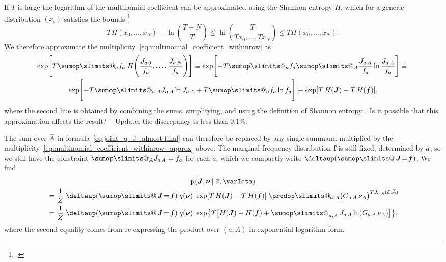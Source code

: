 \documentclass[\ifafour a4paper,12pt,\else a5paper,10pt,\fi%
onecolumn,oneside,article,%
british%
]{memoir}
\makeatletter
\theoremstyle{remark}
\theoremstyle{innote}
\def\sum{\DOTSI\sumop\slimits@}
\def\prod{\DOTSI\prodop\slimits@}
\newcommand*{\citep}{\footcites}
\newcommand*{\delt}{\deltaup}%
\newcommand*{\di}{\mathrm{d}}%
\renewcommand*{\le}{\leqslant}%
\newcommand*{\pf}{\mathrm{p}}%
\renewcommand*{\|}[1][]{\nonscript\,#1\vert\nonscript\;\mathopen{}}
\newcommand*{\tsum}{\mathop{\textstyle\sum}\nolimits}
\newcommand*{\puzzle}{{\fontencoding{U}\fontfamily{fontawesometwo}\selectfont\symbol{225}}}
\newcommand{\mynote}[1]{ {\color{notecolour}\puzzle\ #1}}
\newcommand*{\widebar}[1]{{\mkern1.5mu\skew{2}\overline{\mkern-1.5mu#1\mkern-1.5mu}\mkern 1.5mu}}
\newcommand*{\yff}{f}
\newcommand*{\yf}{\bm{\yff}}
\newcommand*{\yAs}{\widebar{A}}%
\newcommand*{\yas}{\widebar{a}}%
\newcommand*{\ynuu}{\nu}
\newcommand*{\ynu}{\bm{\ynuu}}
\newcommand*{\ysh}{H}
\newcommand*{\yeq}{\mathrel{\!=\!}}
\newcommand*{\yJJ}{J}
\newcommand*{\yJ}{\bm{\yJJ}}
\newcommand*{\yI}{\varIota}
\makeatother
\begin{document}
If $T$ is large the logarithm of the multinomial coefficient can be
approximated using the Shannon entropy $\ysh$, which for a generic
distribution $(x_{i})$ satisfies the bounds \citep[Lemma 2.2 pp.
429--430 in][]{csiszaretal2004b}
\begin{equation}
  \label{eq:approx_multinomial}
  T \ysh(x_{0},\dotsc,x_{N}) - \ln\binom{T+N}{T} \le
  \ln\binom{T}{Tx_{0},\dotsc,Tx_{N}} \le T \ysh(x_{0},\dotsc,x_{N}).
\end{equation}
We therefore approximate the
multiplicity~\eqref{eq:multinomial_coefficient_withinrow} as
\begin{multline}
  \label{eq:multinomial_coefficient_withinrow_approx}
  \exp\Biggl[T\sum_{a} f_{a}\;\ysh\Biggl(
\frac{J_{a\,0}}{f_{a}}, \dotsc,
\frac{J_{a\,N}}{f_{a}}\Biggr)
    \Biggr] \equiv
  \exp\Biggl[-T\sum_{a} f_{a} \sum_{A}
    \frac{J_{a\,A}}{f_{a}}\ln\frac{J_{a\,A}}{f_{a}}
    \Biggr]
    \equiv{}\\
    \exp\Biggl[-T \sum_{a,A} J_{a\,A}\ln J_{a\,A} + T  \sum_{a} f_{a}\ln f_{a}\Biggr]
    \equiv
    \exp[T\,\ysh(\yJ) - T\,\ysh(\yf)],
\end{multline}
where the second line is obtained by combining the sums, simplifying, and
using the definition of Shannon entropy. \mynote{Is it possible that this
  approximation affects the result? -- Update: the discrepancy is less than
0.1\%.}

\bigskip

The sum over $\yAs$ in formula~\eqref{eq:joint_q_J_almost-final} can
therefore be replaced by any single summand multiplied by the
multiplicity~\eqref{eq:multinomial_coefficient_withinrow_approx} above. The
marginal frequency distribution $\yf$ is still fixed, determined by $\yas$,
so we still have the constraint $\sum_{A}J_{a\,A}=f_{a}$ for each $a$,
which we compactly write $\delt(\tsum\yJ\yeq \yf)$. We find
\begin{multline}
  \label{eq:final_expression_multiplicity}
      \pf(\yJ, \ynu \| \yas, \yI) \\
  \begin{aligned}
  &=\frac{1}{Z}\;\delt(\tsum\yJ \yeq \yf)
  \;q(\ynu)\;
  \exp[T\,\ysh(\yJ) - T\,\ysh(\yf)]\;
  \prod_{a,A} \bigl(G_{a\,A}\,\nu_{A}\bigr)^{T J_{a\,A}(\yas,\yAs)}
  \\
     &=
  \frac{1}{Z}\;\delt(\tsum\yJ \yeq \yf)
  \;q(\ynu)\;%
  \exp\bigl\{T\bigl[
  \ysh(\yJ) - \ysh(\yf)
  + \tsum_{a,A} J_{a\,A}\ln(G_{a\,A}\,\nu_{A})
  \bigr]\bigr\},
\end{aligned}
\end{multline}
where the second equality comes from re-expressing the product over $(a,A)$
in exponential-logarithm form.
\end{document}
